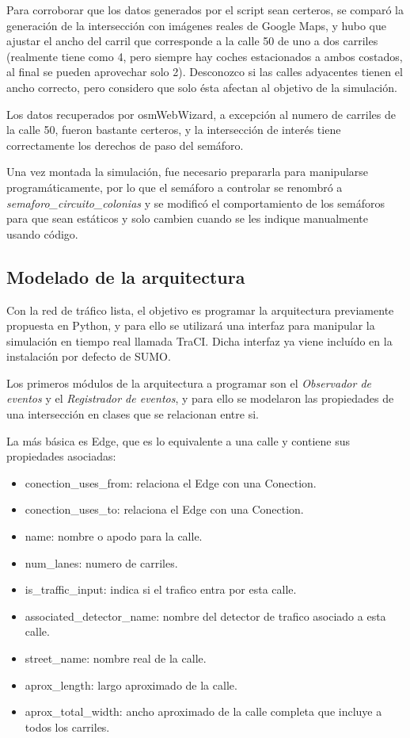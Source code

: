 Para corroborar que los datos generados por el script sean certeros, se
comparó la generación de la intersección con imágenes reales de Google
Maps, y hubo que ajustar el ancho del carril que corresponde a la calle
50 de uno a dos carriles (realmente tiene como 4, pero siempre hay
coches estacionados a ambos costados, al final se pueden aprovechar solo
2). Desconozco si las calles adyacentes tienen el ancho correcto, pero
considero que solo ésta afectan al objetivo de la simulación.

Los datos recuperados por osmWebWizard, a excepción al numero de
carriles de la calle 50, fueron bastante certeros, y la intersección de
interés tiene correctamente los derechos de paso del semáforo.

Una vez montada la simulación, fue necesario prepararla para manipularse
programáticamente, por lo que el semáforo a controlar se renombró a
\emph{semaforo\_circuito\_colonias} y se modificó el comportamiento de
los semáforos para que sean estáticos y solo cambien cuando se les
indique manualmente usando código.

\hypertarget{modelado-de-la-arquitectura}{%
\subsection{Modelado de la
arquitectura}\label{modelado-de-la-arquitectura}}

Con la red de tráfico lista, el objetivo es programar la arquitectura
previamente propuesta en Python, y para ello se utilizará una interfaz
para manipular la simulación en tiempo real llamada TraCI. Dicha
interfaz ya viene incluído en la instalación por defecto de SUMO.

Los primeros módulos de la arquitectura a programar son el
\emph{Observador de eventos} y el \emph{Registrador de eventos}, y para
ello se modelaron las propiedades de una intersección en clases que se
relacionan entre si.

La más básica es Edge, que es lo equivalente a una calle y contiene sus
propiedades asociadas:

\begin{itemize}
\item
  conection\_uses\_from: relaciona el Edge con una Conection.
\item
  conection\_uses\_to: relaciona el Edge con una Conection.
\item
  name: nombre o apodo para la calle.
\item
  num\_lanes: numero de carriles.
\item
  is\_traffic\_input: indica si el trafico entra por esta calle.
\item
  associated\_detector\_name: nombre del detector de trafico asociado a
  esta calle.
\item
  street\_name: nombre real de la calle.
\item
  aprox\_length: largo aproximado de la calle.
\item
  aprox\_total\_width: ancho aproximado de la calle completa que incluye
  a todos los carriles.
\end{itemize}

